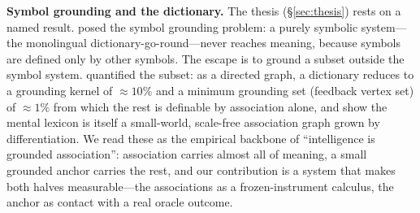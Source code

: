 \documentclass[10pt,twocolumn]{article}
\begin{document}
\textbf{Symbol grounding and the dictionary.} The thesis (\S\ref{sec:thesis})
rests on a named result. \citet{harnad1990symbol} posed the symbol grounding
problem: a purely symbolic system---the monolingual dictionary-go-round---never
reaches meaning, because symbols are defined only by other symbols. The escape is
to ground a subset outside the symbol system. \citet{vincentlamarre2016latent}
quantified the subset: as a directed graph, a dictionary reduces to a grounding
kernel of $\approx 10\%$ and a minimum grounding set (feedback vertex set) of
$\approx 1\%$ from which the rest is definable by association alone, and
\citet{steyvers2005largescale} show the mental lexicon is itself a small-world,
scale-free association graph grown by differentiation. We read these as the
empirical backbone of ``intelligence is grounded association'': association
carries almost all of meaning, a small grounded anchor carries the rest, and our
contribution is a system that makes both halves measurable---the associations as a
frozen-instrument calculus, the anchor as contact with a real oracle outcome.
\end{document}
